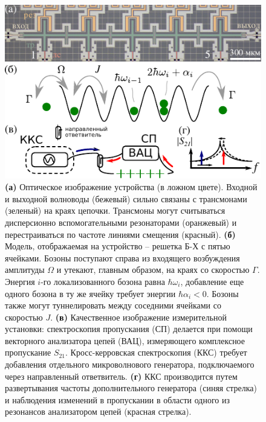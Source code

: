 \documentclass[14pt, a4paper]{extreport}
\numberwithin{equation}{section}
\begin{document}
\begin{figure}[t]
	\centering
	\includegraphics[width=0.8\linewidth]{Pictures/scheme_bh}
	\caption{\textbf{(а)} Оптическое изображение устройства (в ложном цвете). Входной и выходной волноводы (бежевый) сильно связаны с трансмонами (зеленый) на краях цепочки. Трансмоны могут считываться дисперсионно вспомогательными резонаторами (оранжевый) и перестраиваться по частоте линиями смещения (красный). \textbf{(б)} Модель, отображаемая на устройство -- решетка Б-Х с пятью ячейками. Бозоны поступают справа из входящего возбуждения амплитуды $\Omega$ и утекают, главным образом, на краях со скоростью $\Gamma$. Энергия $i$-го локализованного бозона равна $\hbar\omega_i$, добавление еще одного бозона в ту же ячейку требует энергии $\hbar \alpha_i<0$. Бозоны также могут туннелировать между соседними ячейками со скоростью $J$. \textbf{(в)} Качественное изображение измерительной установки: спектроскопия пропускания (СП) делается при помощи векторного анализатора цепей (ВАЦ), измеряющего комплексное пропускание $S_{21}$. Кросс-керровская спектроскопия (ККС) требует добавления отдельного микроволнового генератора, подключаемого через направленный ответвитель. \textbf{(г)} ККС производится путем развертывания частоты дополнительного генератора (синяя стрелка) и наблюдения изменений в пропускании в области одного из резонансов анализатором цепей (красная стрелка).}
	\label{fig:schemebh}
\end{figure}
\end{document}
